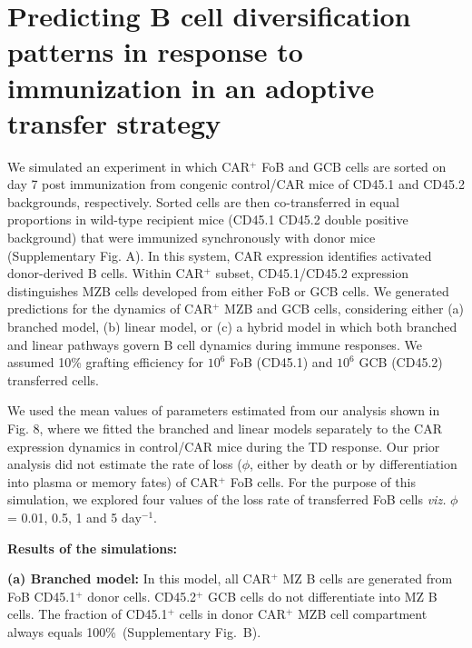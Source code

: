 \documentclass[11pt]{article}
\newcommand{\red}[1]{{\color{red}{#1}}}
\begin{document}
\section*{Predicting B cell diversification patterns in response to immunization in an adoptive transfer strategy}
We simulated an experiment in which CAR$^{+}$ FoB and GCB cells are sorted on day 7 post immunization from congenic control/CAR mice of CD45.1 and CD45.2 backgrounds, respectively. 
Sorted cells are then co-transferred in equal proportions in wild-type recipient mice (CD45.1 CD45.2 double positive background) that were immunized synchronously with donor mice (Supplementary Fig. \red{XX}A). 
In this system, CAR expression identifies activated donor-derived B cells. Within CAR$^{+}$ subset, CD45.1/CD45.2 expression distinguishes MZB cells developed from either FoB or GCB cells.
We generated predictions for the dynamics of CAR$^{+}$  MZB and GCB cells, considering either (a) branched model, (b) linear model, or (c) a hybrid model in which both branched and linear pathways govern B cell dynamics during immune responses. 
We assumed 10\% grafting efficiency for $10^{6}$ FoB (CD45.1) and $10^{6}$ GCB (CD45.2) transferred cells. 

We used the mean values of parameters estimated from our analysis shown in Fig. 8, where we fitted the branched and linear models separately to the CAR expression dynamics in control/CAR mice during the TD response.
Our prior analysis did not estimate the rate of loss ($\phi$, either by death or by differentiation into plasma or memory fates) of CAR$^{+}$ FoB cells.
For the purpose of this simulation, we explored four values of the loss rate of transferred FoB cells \textit{viz.} $\phi$ = 0.01, 0.5, 1 and 5 day$^{-1}$.

\textbf{Results of the simulations:}

\textbf{(a) Branched model:}
In this model, all CAR$^{+}$  MZ B cells are generated from FoB CD45.1$^{+}$ donor cells.
CD45.2$^{+}$ GCB cells do not differentiate into MZ B cells.
The fraction of CD45.1$^{+}$ cells in donor CAR$^{+}$ MZB cell compartment always equals 100\%~(Supplementary Fig.~\red{XX}B).
\end{document}
